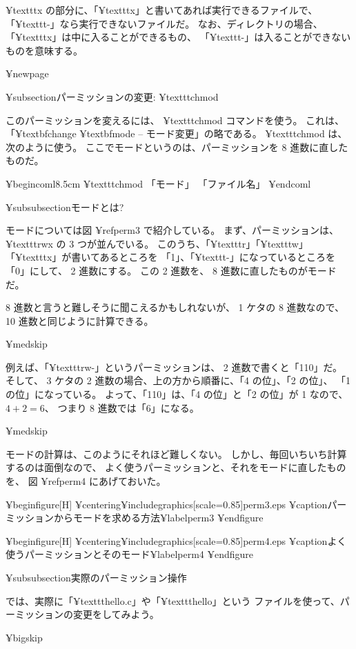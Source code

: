  ¥texttt{x} の部分に、「¥texttt{x}」と書いてあれば実行できるファイルで、
「¥texttt{-}」なら実行できないファイルだ。
なお、ディレクトリの場合、「¥texttt{x}」は中に入ることができるもの、
「¥texttt{-}」は入ることができないものを意味する。

¥newpage

¥subsection{パーミッションの変更: ¥texttt{chmod}}

このパーミッションを変えるには、 ¥texttt{chmod} コマンドを使う。
これは、「¥textbf{ch}ange ¥textbf{mod}e -- モード変更」の略である。
 ¥texttt{chmod} は、次のように使う。
ここでモードというのは、パーミッションを 8 進数に直したものだ。

¥begin{coml}{8.5cm}
¥texttt{chmod} 「モード」 「ファイル名」
¥end{coml}

¥subsubsection{モードとは?}

モードについては図 ¥ref{perm3} で紹介している。
まず、パーミッションは、 ¥texttt{rwx} の 3 つが並んでいる。
このうち、「¥texttt{r}」「¥texttt{w}」「¥texttt{x}」が書いてあるところを
「1」、「¥texttt{-}」になっているところを「0」にして、 2 進数にする。
この 2 進数を、 8 進数に直したものがモードだ。

 8 進数と言うと難しそうに聞こえるかもしれないが、
 1 ケタの 8 進数なので、 10 進数と同じように計算できる。

¥medskip

例えば、「¥texttt{rw-}」というパーミッションは、 2 進数で書くと「110」だ。
そして、 3 ケタの  2 進数の場合、上の方から順番に、「4 の位」、「2 の位」、
「1 の位」になっている。
よって、「110」は、「4 の位」と「2 の位」が 1 なので、 $ 4+2=6 $、
つまり 8 進数では「6」になる。

¥medskip

モードの計算は、このようにそれほど難しくない。
しかし、毎回いちいち計算するのは面倒なので、
よく使うパーミッションと、それをモードに直したものを、
図 ¥ref{perm4} にあげておいた。

¥begin{figure}[H]
¥centering{¥includegraphics[scale=0.85]{perm3.eps}}
¥caption{パーミッションからモードを求める方法}¥label{perm3}
¥end{figure}

¥begin{figure}[H]
¥centering{¥includegraphics[scale=0.85]{perm4.eps}}
¥caption{よく使うパーミッションとそのモード}¥label{perm4}
¥end{figure}

¥subsubsection{実際のパーミッション操作}

では、実際に「¥texttt{hello.c}」や「¥texttt{hello}」という
ファイルを使って、パーミッションの変更をしてみよう。

¥bigskip

